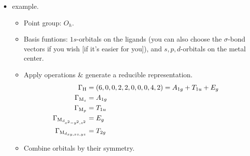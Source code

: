 \documentclass[../notes.tex]{subfiles}
\begin{document}
\begin{itemize}
\begin{enumerate}
    \end{enumerate}
    \item {} example.
    \begin{itemize}
        \item Point group: $O_h$.
        \item Basis funtions: $1s$-orbitals on the ligands (you can also choose the $\sigma$-bond vectors if you wish [if it's easier for you]), and $s,p,d$-orbitals on the metal center.
        \item Apply operations \& generate a reducible representation.
        \begin{align*}
            \Gamma_{\ce{H}} &= (6,0,0,2,2,0,0,0,4,2) = A_{1g}+T_{1u}+E_g\\
            \Gamma_{\ce{M}_{s}} &= A_{1g}\\
            \Gamma_{\ce{M}_{p}} &= T_{1u}\\
            \Gamma_{\ce{M}_{d_{x^2-y^2,z^2}}} &= E_g\\
            \Gamma_{\ce{M}_{d_{xy,xz,yz}}} &= T_{2g}
        \end{align*}
        \item Combine orbitals by their symmetry.
        \begin{figure}[h!]
            \centering
\end{figure}
\end{itemize}
\end{itemize}
\end{document}
